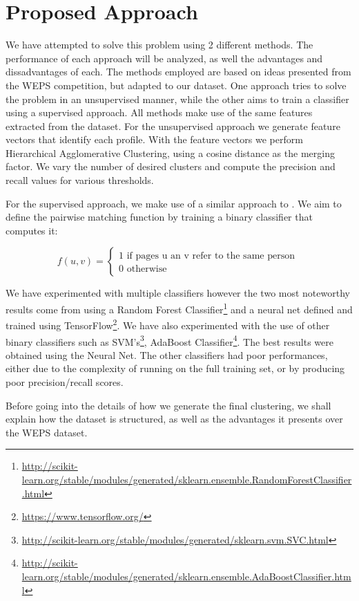 \chapter{Proposed Approach}
\label{chapter:proposed-approach}
We have attempted to solve this problem using 2 different methods. The performance
of each approach will be analyzed, as well the advantages and dissadvantages of
each. The methods employed are based on ideas presented from the WEPS competition,
but adapted to our dataset. One approach tries to solve the problem in an unsupervised
manner, while the other aims to train a classifier using a supervised
approach. All methods make use of the same features extracted from the dataset.
For the unsupervised approach we generate feature vectors that identify each
profile. With the feature vectors we perform Hierarchical Agglomerative Clustering,
using a cosine distance as the merging factor. We vary the number of desired
clusters and compute the precision and recall values for various thresholds.

For the supervised approach, we make use of a similar approach to
\cite{connection-analysis}. We aim to define the pairwise matching function by
training a binary classifier that computes it:

\[ f(u, v) =
    \left\{
        \begin{array}{ll}
            1 \mbox{ if pages u an v refer to the same person } \\
            0 \mbox{ otherwise }
        \end{array}
    \right.
\]

We have experimented with multiple classifiers however the two most noteworthy
results come from using a Random Forest Classifier\footnote{\url{http://scikit-learn.org/stable/modules/generated/sklearn.ensemble.RandomForestClassifier.html}}
and a neural net defined and trained using TensorFlow\footnote{\url{https://www.tensorflow.org/}}.
We have also experimented with the use of other binary classifiers such as SVM's\footnote{\url{http://scikit-learn.org/stable/modules/generated/sklearn.svm.SVC.html}},
AdaBoost Classifier\footnote{\url{http://scikit-learn.org/stable/modules/generated/sklearn.ensemble.AdaBoostClassifier.html}}.
The best results were obtained using the Neural Net. The other classifiers
had poor performances, either due to the complexity of running on the full training set,
or by producing poor precision/recall scores.

Before going into the details of how we generate the final clustering, we shall
explain how the dataset is structured, as well as the advantages it presents
over the WEPS dataset.


